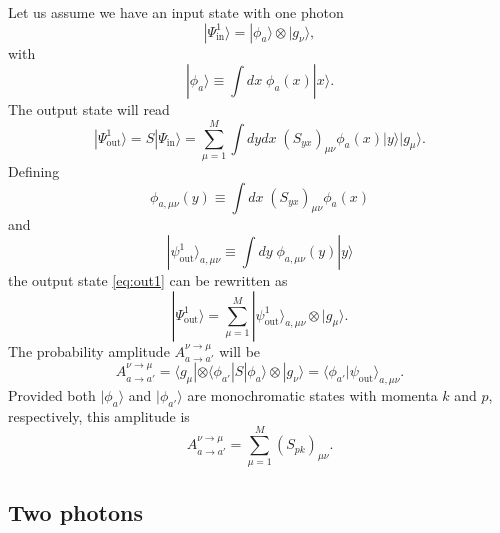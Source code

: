 \documentclass[notitlepage, prx, preprint, amsmath,superscriptaddress,amssymb]{revtex4-1}
\begin{document}
Let us assume we have an input state with one photon
\begin{equation}
|\Psi_\text{in}^1\rangle=|\phi_a\rangle\otimes |g_\nu\rangle,
\end{equation}
with
\begin{equation}
|\phi_a\rangle\equiv \int dx\; \phi_a(x)|x\rangle.
\end{equation}
The output state will read
\begin{equation}\label{eq:out1}
|\Psi_\text{out}^1\rangle = S|\Psi_\text{in}\rangle = \sum_{\mu=1}^M \int dy dx\;(S_{yx})_{\mu\nu}\phi_a(x)|y\rangle|g_\mu\rangle.
\end{equation}
Defining
\begin{equation}\label{eq:phi_munu}
\phi_{a,\mu\nu}(y)\equiv \int dx\; (S_{yx})_{\mu\nu} \phi_a(x)
\end{equation}
and
\begin{equation}\label{eq:out_munu}
|\psi_\text{out}^1\rangle_{a,\mu\nu}\equiv \int dy\;\phi_{a,\mu\nu}(y) |y\rangle
\end{equation}
the output state \eqref{eq:out1} can be rewritten as
\begin{equation}
|\Psi_\text{out}^1\rangle = \sum_{\mu=1}^M |\psi_\text{out}^1\rangle_{a,\mu\nu}\otimes |g_\mu\rangle.
\end{equation}
The probability amplitude $A_{a\to a'}^{\nu\to\mu}$ will be
\begin{equation}\label{eq:A1}
A_{a\to a'}^{\nu\to\mu} = \langle g_\mu|\otimes \langle \phi_{a'}|S|\phi_a\rangle \otimes |g_\nu\rangle = \langle \phi_{a'}|\psi_\text{out}\rangle_{a,\mu\nu}.
\end{equation}
Provided both $|\phi_a\rangle$ and $|\phi_{a'}\rangle$ are monochromatic states with momenta $k$ and $p$, respectively, this amplitude is
\begin{equation}\label{eq:energy_conservation}
A_{a\to a'}^{\nu\to\mu} = \sum_{\mu=1}^M (S_{pk})_{\mu\nu}.
\end{equation}

\subsection{Two photons}
\end{document}
